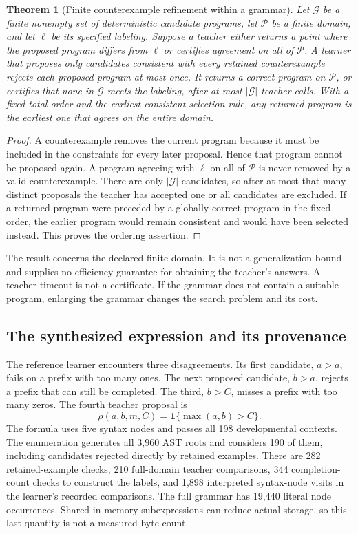 \documentclass[11pt,letterpaper]{article}
\theoremstyle{plain}
\newtheorem{theorem}{Theorem}[section]
\theoremstyle{definition}
\begin{document}
\begin{theorem}[Finite counterexample refinement within a grammar]\label{thm:grammar-refinement}
Let $\mathcal G$ be a finite nonempty set of deterministic candidate programs, let $\mathcal P$ be a finite domain, and let $\ell$ be its specified labeling. Suppose a teacher either returns a point where the proposed program differs from $\ell$ or certifies agreement on all of $\mathcal P$. A learner that proposes only candidates consistent with every retained counterexample rejects each proposed program at most once. It returns a correct program on $\mathcal P$, or certifies that none in $\mathcal G$ meets the labeling, after at most $|\mathcal G|$ teacher calls. With a fixed total order and the earliest-consistent selection rule, any returned program is the earliest one that agrees on the entire domain.
\end{theorem}
\begin{proof}
A counterexample removes the current program because it must be included in the constraints for every later proposal. Hence that program cannot be proposed again. A program agreeing with $\ell$ on all of $\mathcal P$ is never removed by a valid counterexample. There are only $|\mathcal G|$ candidates, so after at most that many distinct proposals the teacher has accepted one or all candidates are excluded. If a returned program were preceded by a globally correct program in the fixed order, the earlier program would remain consistent and would have been selected instead. This proves the ordering assertion.
\end{proof}

The result concerns the declared finite domain. It is not a generalization bound and supplies no efficiency guarantee for obtaining the teacher's answers. A teacher timeout is not a certificate. If the grammar does not contain a suitable program, enlarging the grammar changes the search problem and its cost.

\subsection{The synthesized expression and its provenance}
The reference learner encounters three disagreements. Its first candidate, $a>a$, fails on a prefix with too many ones. The next proposed candidate, $b>a$, rejects a prefix that can still be completed. The third, $b>C$, misses a prefix with too many zeros. The fourth teacher proposal is
\begin{equation}\label{eq:learned-prune}
\rho(a,b,m,C)=\mathbf 1\{\max(a,b)>C\}.
\end{equation}
The formula uses five syntax nodes and passes all 198 developmental contexts. The enumeration generates all 3,960 AST roots and considers 190 of them, including candidates rejected directly by retained examples. There are 282 retained-example checks, 210 full-domain teacher comparisons, 344 completion-count checks to construct the labels, and 1,898 interpreted syntax-node visits in the learner's recorded comparisons. The full grammar has 19,440 literal node occurrences. Shared in-memory subexpressions can reduce actual storage, so this last quantity is not a measured byte count.
\end{document}
